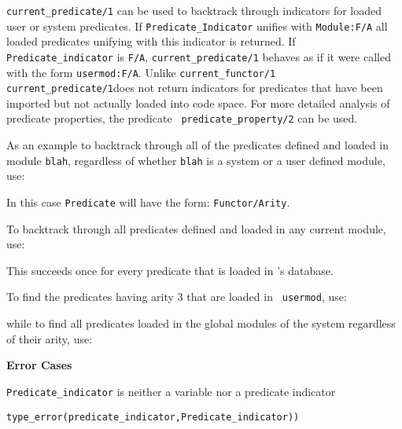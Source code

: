\begin{description}
%
{\tt current\_predicate/1} can be used to backtrack through indicators
for loaded user or system predicates.  If {\tt Predicate\_Indicator}
unifies with {\tt Module:F/A} all loaded predicates unifying with this
indicator is returned.  If {\tt Predicate\_indicator} is {\tt F/A},
{\tt current\_predicate/1} behaves as if it were called with the form
{\tt usermod:F/A}.  Unlike {\tt current\_functor/1} {\tt
current\_predicate/1}does not return indicators for predicates that
have been imported but not actually loaded into code space.  For more
detailed analysis of predicate properties, the predicate {\tt
predicate\_property/2} can be used.

As an example to backtrack through all of the predicates defined and loaded in
module {\tt blah}, regardless of whether {\tt blah} is a system or a
user defined module, use:


    In this case {\tt Predicate} will have the form: {\tt Functor/Arity}.

    To backtrack through all predicates defined and loaded in any current 
    module, use:


    This succeeds once for every predicate that is loaded in \ourprolog's 
    database.

    To find the predicates having arity 3 that are loaded in {\tt
    usermod}, use:


    while to find all predicates loaded in the global modules of the system
    regardless of their arity, use:



{\bf Error Cases}
\bi
\item 	{\tt Predicate\_indicator} is neither a variable nor a predicate indicator
\bi
\item 	{\tt type\_error(predicate\_indicator,Predicate\_indicator))}
\ei
\ei


\end{description}
